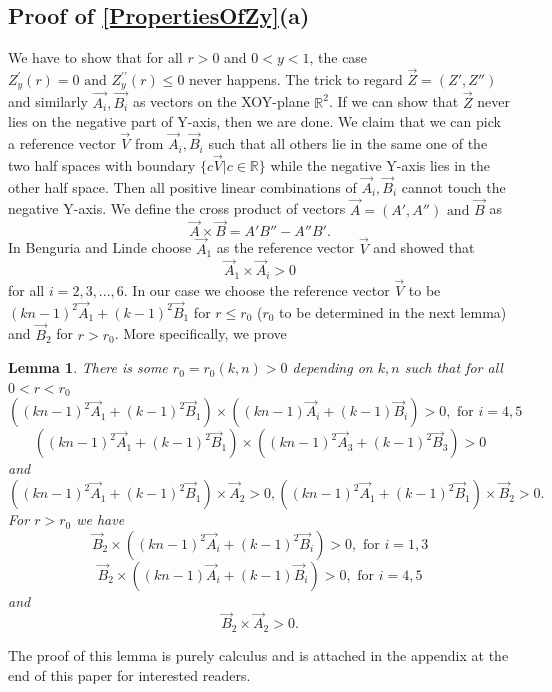 \documentclass{amsart}
\numberwithin{equation}{section}
\theoremstyle{plain}
\newtheorem{lemma}[theorem]{Lemma}
\theoremstyle{definition}
\theoremstyle{remark}
\def\RR {\mathbb{R}}
\begin{document}
\subsection{Proof of \cref{PropertiesOfZy}(a)}
We have to show that for all $r>0$ and $0<y<1$, the case $Z_y^{\prime}(r)=0 \text { and } Z_y^{\prime \prime}(r) \leq 0$ never happens. The trick to regard $\vec{Z}= (Z', Z'')$ and similarly $\vec{A_i}, \vec{B_i}$ as vectors on the XOY-plane $\RR^2$. If we can show that $\vec{Z}$ never lies on the negative part of Y-axis, then we are done. We claim that we can pick a reference vector $\vec V$ from $\vec A_i, \vec B_i$ such that all others lie in the same one of the two half spaces with boundary $\{c \vec V| c\in \RR\}$ while the negative Y-axis lies in the other half space. Then all positive linear combinations of $\vec A_i, \vec B_i$ cannot touch the negative Y-axis. We define the cross product of vectors $\vec A= (A',A'') \text{  and  } \vec B$ as
\[\vec A\times \vec B = A'B''-A''B'.\]
In \cite{benguria2007second} Benguria and Linde choose $\vec A_1$ as the reference vector $\vec{V}$ and showed that
\[\vec A_1\times \vec A_i>0\] for all $i=2,3,...,6$. In our case we choose the reference vector $\vec{V}$ to be $(kn-1)^2\vec A_1+(k-1)^2\vec B_1$ for $r\leq r_0$ ($r_0$ to be determined in the next lemma) and $\vec B_2$ for $r>r_0$. More specifically, we prove
\begin{lemma}\label{Crossproduct positivity lemma}
    There is some $r_0= r_0(k,n)>0$ depending on $k,n$ such that for all $0<r<r_0$
    \[((kn-1)^2\vec A_1+(k-1)^2\vec B_1)\times ((kn-1)\vec A_i+(k-1)\vec B_i) >0, \text{ for } i =4,5\]
    \[((kn-1)^2\vec A_1+(k-1)^2\vec B_1)\times ((kn-1)^2\vec A_3+(k-1)^2\vec B_3) >0\]
    and 
    \[((kn-1)^2\vec A_1+(k-1)^2\vec B_1)\times \vec A_2>0, ( (kn-1)^2 \vec A_1+(k-1)^2 \vec B_1)\times \vec B_2 >0.\]
    For $r>r_0$ we have
    \[\vec B_2 \times ((kn-1)^2\vec A_i+(k-1)^2\vec B_i)>0, \text{ for } i =1,3\]
    \[\vec B_2 \times ((kn-1)\vec A_i+(k-1)\vec B_i)>0, \text{ for } i =4,5\]
    and \[\vec B_2 \times \vec A_2>0.\]
\end{lemma}
The proof of this lemma is purely calculus and is attached in the appendix at the end of this paper for interested readers.
\end{document}
